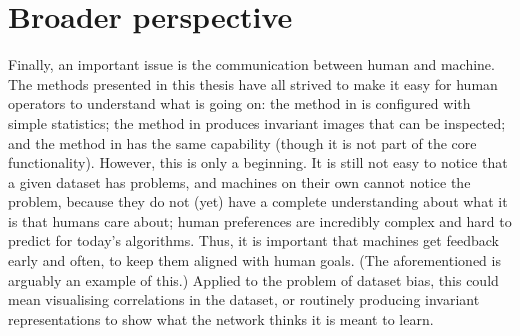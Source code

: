 \section{Broader perspective}\label{sec:broader-perspective}
%
Finally, an important issue is the communication between human and machine.
The methods presented in this thesis have all strived to make it easy for human operators to understand what is going on:
the method in  is configured with simple statistics;
the method in  produces invariant images that can be inspected;
and the method in  has the same capability
(though it is not part of the core functionality).
However, this is only a beginning.
It is still not easy to notice that a given dataset has problems,
and machines on their own cannot notice the problem,
because they do not (yet) have a complete understanding about what it is that humans care about;
human preferences are incredibly complex \citep{yudkowsky2011complex} and hard to predict for today's algorithms.
Thus, it is important that machines get feedback early and often,
to keep them aligned with human goals.
(The aforementioned \citet{stiennon2020learning} is arguably an example of this.)
Applied to the problem of dataset bias,
this could mean visualising correlations in the dataset,
or routinely producing invariant representations to show what the network thinks it is meant to learn.


